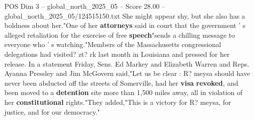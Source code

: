 \begin{textsample}{POS Dim 3 – global\_north\_2025\_05 – Score 28.00 – global\_north\_2025\_05/124515150.txt}
She might appear shy, but she also has a boldness about her."One of her \textbf{attorneys} said in court that the government ' s alleged retaliation for the exercise of free \textbf{speech}"sends a chilling message to everyone who ' s watching."Members of the Massachusetts congressional delegations had visited? zt? rk last month in Louisiana and pressed for her release.
In a statement Friday, Sens.
Ed Markey and Elizabeth Warren and Reps.
Ayanna Pressley and Jim McGovern said,"Let us be clear : R? meysa should have never been abducted off the streets of Somerville, had her \textbf{visa} \textbf{revoked}, and been moved to a \textbf{detention} site more than 1,500 miles away, all in violation of her \textbf{constitutional} rights."They added,"This is a victory for R? meysa, for justice, and for our democracy."

\end{textsample}
